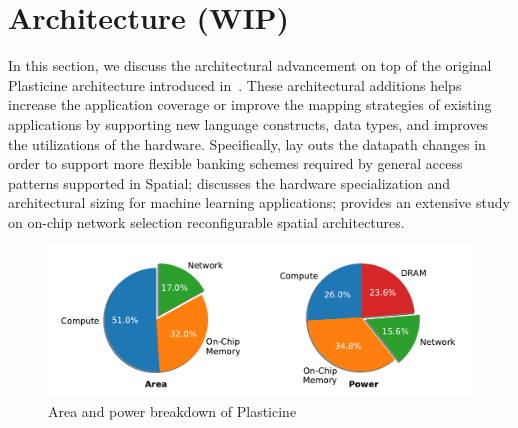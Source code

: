 \chapter{Architecture (WIP)}

In this section, we discuss the architectural advancement on top of the original Plasticine architecture
introduced in~\cite{plasticine}. These architectural additions helps increase the application
coverage or improve the mapping strategies of existing applications by supporting new language
constructs, data types, and improves the utilizations of the hardware. 
Specifically,  lay outs the datapath changes in order to support more
flexible banking schemes required by general access patterns supported in Spatial; 
 discusses the hardware specialization and architectural sizing for machine
learning applications;  provides an extensive study on on-chip network selection 
reconfigurable spatial architectures.

\begin{figure}
\centering
\includegraphics[width=1\textwidth]{figs/pie.pdf}
\caption[Area and power breakdown of Plasticine]{
  Area and power breakdown of Plasticine
}
\label{fig:breakdown}
\end{figure}
